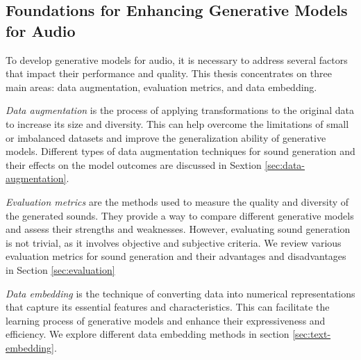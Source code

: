 \subsection{Foundations for Enhancing Generative Models for Audio} \label{sec:parallel-tasks}

To develop generative models for audio, it is necessary to address several factors that impact their performance and quality. This thesis concentrates on three main areas: data augmentation, evaluation metrics, and data embedding.

\textit{Data augmentation} is the process of applying transformations to the original data to increase its size and diversity. This can help overcome the limitations of small or imbalanced datasets and improve the generalization ability of generative models. Different types of data augmentation techniques for sound generation and their effects on the model outcomes are discussed in Sextion \ref{sec:data-augmentation}.

\textit{Evaluation metrics} are the methods used to measure the quality and diversity of the generated sounds. They provide a way to compare different generative models and assess their strengths and weaknesses. However, evaluating sound generation is not trivial, as it involves objective and subjective criteria. We review various evaluation metrics for sound generation and their advantages and disadvantages in Section \ref{sec:evaluation}

\textit{Data embedding} is the technique of converting data into numerical representations that capture its essential features and characteristics. This can facilitate the learning process of generative models and enhance their expressiveness and efficiency. We explore different data embedding methods in section \ref{sec:text-embedding}.



